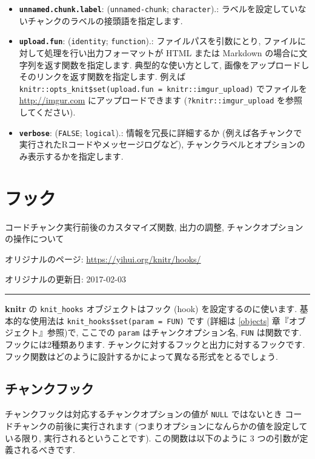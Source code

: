 \documentclass[
]{bxjsreport}
\begin{document}
\begin{itemize}
\item
  \textbf{\texttt{unnamed.chunk.label}}: (\texttt{unnamed-chunk};
  \texttt{character}).:
  ラベルを設定していないチャンクのラベルの接頭語を指定します.
\item
  \textbf{\texttt{upload.fun}}: (\texttt{identity}; \texttt{function}).:
  ファイルパスを引数にとり, ファイルに対して処理を行い出力フォーマットが
  HTML または Markdown の場合に文字列を返す関数を指定します.
  典型的な使い方として,
  画像をアップロードしそのリンクを返す関数を指定します. 例えば
  \texttt{knitr::opts\_knit\$set(upload.fun\ =\ knitr::imgur\_upload)}
  でファイルを \url{http://imgur.com} にアップロードできます
  (\texttt{?knitr::imgur\_upload} を参照してください).
\item
  \textbf{\texttt{verbose}}: (\texttt{FALSE}; \texttt{logical}).:
  情報を冗長に詳細するか
  (例えば各チャンクで実行されたRコードやメッセージログなど),
  チャンクラベルとオプションのみ表示するかを指定します.
\end{itemize}

\hypertarget{hooks}{%
\chapter{フック}\label{hooks}}

コードチャンク実行前後のカスタマイズ関数, 出力の調整,
チャンクオプションの操作について

オリジナルのページ: \url{https://yihui.org/knitr/hooks/}

オリジナルの更新日: 2017-02-03

\begin{center}\rule{0.5\linewidth}{0.5pt}\end{center}

\textbf{knitr} の \texttt{knit\_hooks} オブジェクトはフック (hook)
を設定するのに使います. 基本的な使用法は
\texttt{knit\_hooks\$set(param\ =\ FUN)} です (詳細は \ref{objects}
章『オブジェクト』参照)で, ここでの \texttt{param}
はチャンクオプション名, \texttt{FUN} は関数です.
フックには2種類あります. チャンクに対するフックと出力に対するフックです.
フック関数はどのように設計するかによって異なる形式をとるでしょう.

\hypertarget{ux30c1ux30e3ux30f3ux30afux30d5ux30c3ux30af}{%
\section{チャンクフック}\label{ux30c1ux30e3ux30f3ux30afux30d5ux30c3ux30af}}

チャンクフックは対応するチャンクオプションの値が \texttt{NULL}
ではないとき コードチャンクの前後に実行されます
(つまりオプションになんらかの値を設定している限り,
実行されるということです). この関数は以下のように 3
つの引数が定義されるべきです.
\end{document}

